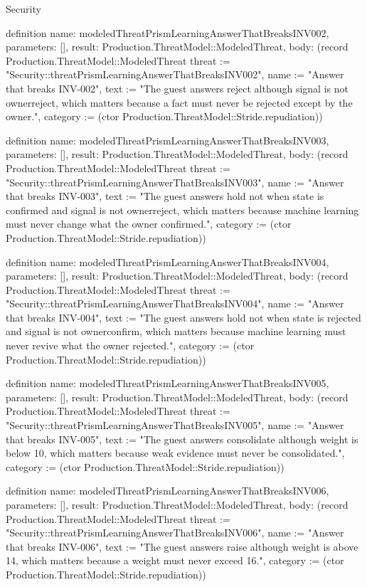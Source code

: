 \begin{lexlean}{Security}
\begin{semanticmodule}
definition{
  name: modeledThreatPrismLearningAnswerThatBreaksINV002,
  parameters: [],
  result: Production.ThreatModel::ModeledThreat,
  body: (record Production.ThreatModel::ModeledThreat {threat := "Security::threatPrismLearningAnswerThatBreaksINV002", name := "Answer that breaks INV-002", text := "The guest answers reject although signal is not ownerreject, which matters because a fact must never be rejected except by the owner.", category := (ctor Production.ThreatModel::Stride.repudiation)})
}

definition{
  name: modeledThreatPrismLearningAnswerThatBreaksINV003,
  parameters: [],
  result: Production.ThreatModel::ModeledThreat,
  body: (record Production.ThreatModel::ModeledThreat {threat := "Security::threatPrismLearningAnswerThatBreaksINV003", name := "Answer that breaks INV-003", text := "The guest answers hold not when state is confirmed and signal is not ownerreject, which matters because machine learning must never change what the owner confirmed.", category := (ctor Production.ThreatModel::Stride.repudiation)})
}

definition{
  name: modeledThreatPrismLearningAnswerThatBreaksINV004,
  parameters: [],
  result: Production.ThreatModel::ModeledThreat,
  body: (record Production.ThreatModel::ModeledThreat {threat := "Security::threatPrismLearningAnswerThatBreaksINV004", name := "Answer that breaks INV-004", text := "The guest answers hold not when state is rejected and signal is not ownerconfirm, which matters because machine learning must never revive what the owner rejected.", category := (ctor Production.ThreatModel::Stride.repudiation)})
}

definition{
  name: modeledThreatPrismLearningAnswerThatBreaksINV005,
  parameters: [],
  result: Production.ThreatModel::ModeledThreat,
  body: (record Production.ThreatModel::ModeledThreat {threat := "Security::threatPrismLearningAnswerThatBreaksINV005", name := "Answer that breaks INV-005", text := "The guest answers consolidate although weight is below 10, which matters because weak evidence must never be consolidated.", category := (ctor Production.ThreatModel::Stride.repudiation)})
}

definition{
  name: modeledThreatPrismLearningAnswerThatBreaksINV006,
  parameters: [],
  result: Production.ThreatModel::ModeledThreat,
  body: (record Production.ThreatModel::ModeledThreat {threat := "Security::threatPrismLearningAnswerThatBreaksINV006", name := "Answer that breaks INV-006", text := "The guest answers raise although weight is above 14, which matters because a weight must never exceed 16.", category := (ctor Production.ThreatModel::Stride.repudiation)})
}


\end{semanticmodule}
\end{lexlean}
